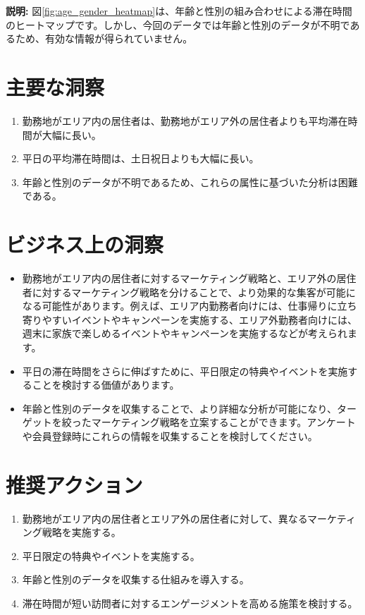 \documentclass[11pt,a4paper]{article}
\begin{document}
\textbf{説明:}
図\ref{fig:age_gender_heatmap}は、年齢と性別の組み合わせによる滞在時間のヒートマップです。しかし、今回のデータでは年齢と性別のデータが不明であるため、有効な情報が得られていません。

\section{主要な洞察}

\begin{enumerate}
    \item 勤務地がエリア内の居住者は、勤務地がエリア外の居住者よりも平均滞在時間が大幅に長い。
    \item 平日の平均滞在時間は、土日祝日よりも大幅に長い。
    \item 年齢と性別のデータが不明であるため、これらの属性に基づいた分析は困難である。
\end{enumerate}

\section{ビジネス上の洞察}

\begin{itemize}
    \item 勤務地がエリア内の居住者に対するマーケティング戦略と、エリア外の居住者に対するマーケティング戦略を分けることで、より効果的な集客が可能になる可能性があります。例えば、エリア内勤務者向けには、仕事帰りに立ち寄りやすいイベントやキャンペーンを実施する、エリア外勤務者向けには、週末に家族で楽しめるイベントやキャンペーンを実施するなどが考えられます。
    \item 平日の滞在時間をさらに伸ばすために、平日限定の特典やイベントを実施することを検討する価値があります。
    \item 年齢と性別のデータを収集することで、より詳細な分析が可能になり、ターゲットを絞ったマーケティング戦略を立案することができます。アンケートや会員登録時にこれらの情報を収集することを検討してください。
\end{itemize}

\section{推奨アクション}

\begin{enumerate}
    \item 勤務地がエリア内の居住者とエリア外の居住者に対して、異なるマーケティング戦略を実施する。
    \item 平日限定の特典やイベントを実施する。
    \item 年齢と性別のデータを収集する仕組みを導入する。
    \item 滞在時間が短い訪問者に対するエンゲージメントを高める施策を検討する。
\end{enumerate}
\end{document}
